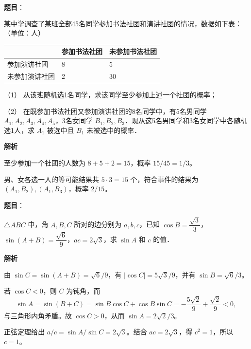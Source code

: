 \begin{answer}

\textbf{题目}：

某中学调查了某班全部45名同学参加书法社团和演讲社团的情况，数据如下表：（单位：人）

\begin{center}
\begin{tabular}{lll}
\toprule
 & 参加书法社团 & 未参加书法社团 \\
\midrule
参加演讲社团 & 8 & 5 \\
未参加演讲社团 & 2 & 30 \\
\bottomrule
\end{tabular}
\end{center}

（1） 从该班随机选1名同学，求该同学至少参加上述一个社团的概率；

（2） 在既参加书法社团又参加演讲社团的8名同学中，有5名男同学 \(A_1,A_2,A_3,A_4,A_5\)，3名女同学 \(B_1,B_2,B_3\)．现从这5名男同学和3名女同学中各随机选1人，求 \(A_1\) 被选中且 \(B_1\) 未被选中的概率．

\textbf{解析}


至少参加一个社团的人数为 \(8+5+2=15\)，概率 \(15/45=1/3\)。


男、女各选一人的等可能结果共 \(5\cdot3=15\) 个，符合事件的结果为 \((A_1,B_2),(A_1,B_3)\)，概率 \(2/15\)。



\end{answer}
\begin{answer}

\textbf{题目}：

\(\triangle ABC\) 中，角 \(A,B,C\) 所对的边分别为 \(a,b,c\)，已知 \(\cos B=\dfrac{\sqrt3}{3}\)，\(\sin(A+B)=\dfrac{\sqrt6}{9}\)，\(ac=2\sqrt3\)，求 \(\sin A\) 和 \(c\) 的值．

\textbf{解析}

由 \(\sin C=\sin(A+B)=\sqrt6/9\)，有 \(|\cos C|=5\sqrt3/9\)，并有 \(\sin B=\sqrt6/3\)。

若 \(\cos C<0\)，则 \(C\) 为钝角，而
\nopagebreak[4]
\[
\sin A=\sin(B+C)=\sin B\cos C+\cos B\sin C
=-\frac{5\sqrt2}{9}+\frac{\sqrt2}{9}<0,
\]
与三角形内角矛盾。故 \(\cos C>0\)，从而 \(\sin A=2\sqrt2/3\)。

正弦定理给出 \(a/c=\sin A/\sin C=2\sqrt3\)。结合 \(ac=2\sqrt3\)，得 \(c^2=1\)，所以 \(c=1\)。


\end{answer}
